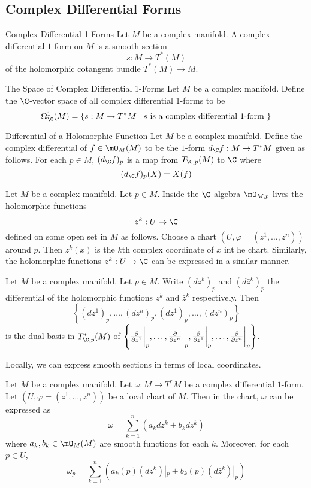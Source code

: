 \documentclass[a4paper]{article}
\begin{document}
\subsection{Complex Differential Forms}
\begin{defn}{Complex Differential 1-Forms}{} Let $M$ be a complex manifold. A complex differential $1$-form on $M$ is a smooth section $$s:M\to T^\ast(M)$$ of the holomorphic cotangent bundle $T^\ast(M)\to M$. 
\end{defn}

\begin{defn}{The Space of Complex Differential 1-Forms}{} Let $M$ be a complex manifold. Define the $\C$-vector space of all complex differential 1-forms to be $$\Omega_\C^1(M)=\{s:M\to T^\ast M\;|\;s\text{ is a complex differential }1\text{-form }\}$$
\end{defn}

\begin{defn}{Differential of a Holomorphic Function}{} Let $M$ be a complex manifold. Define the complex differential of $f\in\mO_M(M)$ to be the $1$-form $d_\C f:M\to T^\ast M$ given as follows. For each $p\in M$, $(d_\C f)_p$ is a map from $T_{\C,p}(M)$ to $\C$ where $$(d_\C f)_p(X)=X(f)$$
\end{defn}

Let $M$ be a complex manifold. Let $p\in M$. Inside the $\C$-algebra $\mO_{M,p}$ lives the holomorphic functions $$z^k:U\to\C$$ defined on some open set in $M$ as follows. Choose a chart $(U,\varphi=(z^1,\dots,z^n))$ around $p$. Then $z^k(x)$ is the $k$th complex coordinate of $x$ int he chart. Similarly, the holomorphic functions $\bar{z}^k:U\to\C$ can be expressed in a similar manner. 

\begin{prp}{}{} Let $M$ be a complex manifold. Let $p\in M$. Write $(dz^k)_p$ and $(d\bar{z}^k)_p$ the differential of the holomorphic functions $z^k$ and $\bar{z}^k$ respectively. Then $$\left\{(dz^1)_p,\dots,(dz^n)_p,(d\bar{z}^1)_p,\dots,(d\bar{z}^n)_p\right\}$$ is the dual basis in $T_{\C,p}^\ast(M)$ of $\left\{\frac{\partial}{\partial z^1}\bigg\vert_p,\dots,\frac{\partial}{\partial z^n}\bigg{|}_p,\frac{\partial}{\partial\bar{z}^1}\bigg\vert_p,\dots,\frac{\partial}{\partial\bar{z}^n}\bigg{|}_p\right\}$.
\end{prp}

Locally, we can express smooth sections in terms of local coordinates. 

\begin{prp}{}{} Let $M$ be a complex manifold. Let $\omega:M\to T^\ast M$ be a complex differential $1$-form. Let $(U,\varphi=(z^1,\dots,z^n))$ be a local chart of $M$. Then in the chart, $\omega$ can be expressed as $$\omega=\sum_{k=1}^n(a_kdz^k+b_kd\bar{z}^k)$$ where $a_k,b_k\in\mO_M(M)$ are smooth functions for each $k$. Moreover, for each $p\in U$, $$\omega_p=\sum_{k=1}^n\left(a_k(p)(dz^k)|_p+b_k(p)(d\bar{z}^k)|_p\right)$$ 
\end{prp}
\end{document}
